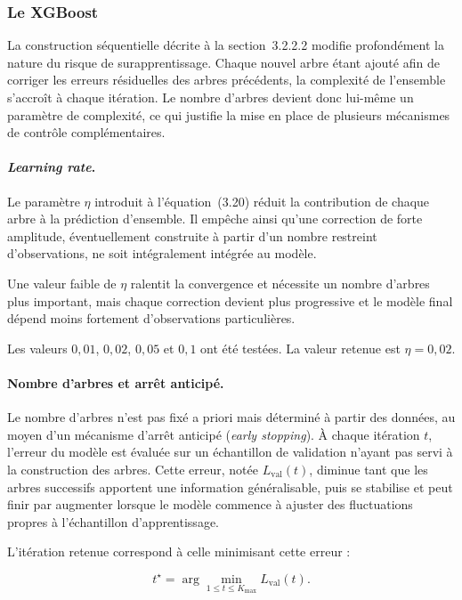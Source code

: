 \subsubsection{Le XGBoost}

La construction séquentielle décrite à la section~3.2.2.2 modifie profondément la nature 
du risque de surapprentissage. Chaque nouvel arbre étant ajouté afin de corriger les 
erreurs résiduelles des arbres précédents, la complexité de l'ensemble s'accroît à chaque 
itération. Le nombre d'arbres devient donc lui-même un paramètre de complexité, ce qui 
justifie la mise en place de plusieurs mécanismes de contrôle complémentaires.

\paragraph{\textit{Learning rate}.}
Le paramètre $\eta$ introduit à l'équation~(3.20) réduit la contribution de chaque arbre 
à la prédiction d'ensemble. Il empêche ainsi qu'une correction de forte amplitude, 
éventuellement construite à partir d'un nombre restreint d'observations, ne soit 
intégralement intégrée au modèle.

Une valeur faible de $\eta$ ralentit la convergence et nécessite un nombre d'arbres plus 
important, mais chaque correction devient plus progressive et le modèle final dépend 
moins fortement d'observations particulières.

Les valeurs \(0{,}01\), \(0{,}02\), \(0{,}05\) et \(0{,}1\) ont été testées.
La valeur retenue est \(\eta = 0{,}02\).

\paragraph{Nombre d'arbres et arrêt anticipé.}
Le nombre d'arbres n'est pas fixé a priori mais déterminé à partir des données, au moyen 
d'un mécanisme d'arrêt anticipé (\textit{early stopping}). À chaque itération $t$, 
l'erreur du modèle est évaluée sur un échantillon de validation n'ayant pas servi à la 
construction des arbres. Cette erreur, notée $L_{\text{val}}(t)$, diminue tant que les 
arbres successifs apportent une information généralisable, puis se stabilise et peut 
finir par augmenter lorsque le modèle commence à ajuster des fluctuations propres à 
l'échantillon d'apprentissage.

L'itération retenue correspond à celle minimisant cette erreur :

\begin{equation}
t^{\star} = \arg\min_{1 \le t \le K_{\max}} L_{\text{val}}(t).
\label{eq:early-stopping}
\end{equation}

